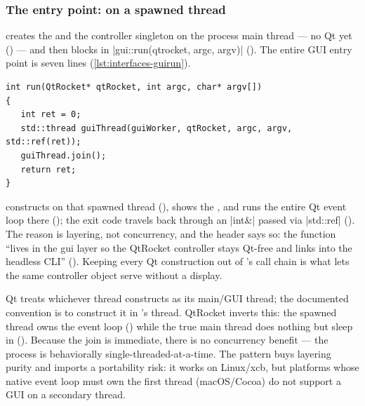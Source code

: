 \subsubsection{The entry point:  on a spawned thread}
\label{sec:interfaces-gui-thread}

 creates the  and the  controller singleton on the
process main thread --- no Qt yet () --- and then blocks in
\cppinline|gui::run(qtrocket, argc, argv)| (). The entire GUI entry point is
seven lines (\cref{lst:interfaces-guirun}).

\begin{listing}[htbp]
\begin{verbatim}
int run(QtRocket* qtRocket, int argc, char* argv[])
{
   int ret = 0;
   std::thread guiThread(guiWorker, qtRocket, argc, argv, std::ref(ret));
   guiThread.join();
   return ret;
}
\end{verbatim}
\caption{The whole GUI entry point: spawn a worker thread, join it immediately, and return
the exit code through an out-parameter.  is constructed inside
, on the spawned thread. }
\label{lst:interfaces-guirun}
\end{listing}

 constructs  on that spawned thread
(), shows the , and runs the entire Qt event loop
there (); the exit code travels back through an \cppinline|int&|
passed via \cppinline|std::ref| (). The reason is layering, not
concurrency, and the header says so: the function ``lives in the gui layer so the QtRocket
controller stays Qt-free and links into the headless CLI'' ().
Keeping every Qt construction out of 's call chain is what lets the same
controller object serve  without a display.

\begin{keyinsight}
Qt treats whichever thread constructs  as its main/GUI thread; the
documented convention is to construct it in 's thread. QtRocket inverts this:
the spawned thread owns the event loop () while the true main
thread does nothing but sleep in  (). Because the
join is immediate, there is no concurrency benefit --- the process is behaviorally
single-threaded-at-a-time. The pattern buys layering purity and imports a portability risk:
it works on Linux/xcb, but platforms whose native event loop must own the first thread
(macOS/Cocoa) do not support a GUI on a secondary thread.
\end{keyinsight}

